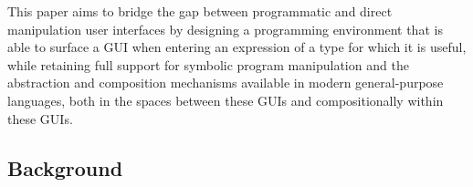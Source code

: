 
This paper aims to bridge the gap between
programmatic and direct manipulation user interfaces by designing
a programming environment that
is able to surface a GUI when entering an expression of a type for which
it is useful, while retaining full support for symbolic program manipulation
and the abstraction and composition mechanisms
available in modern general-purpose languages, both
in the spaces between these GUIs and compositionally within these GUIs.

\subsection{Background}\label{sec:background}

